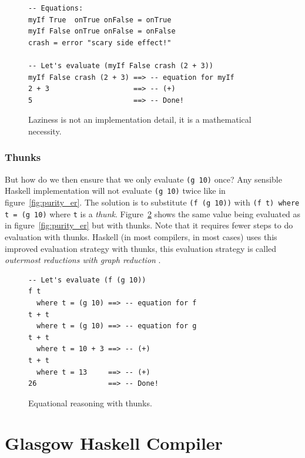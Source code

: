 \begin{figure}
\begin{mdframed}
  \begin{verbatim}
-- Equations:
myIf True  onTrue onFalse = onTrue
myIf False onTrue onFalse = onFalse
crash = error "scary side effect!"

-- Let's evaluate (myIf False crash (2 + 3))
myIf False crash (2 + 3) ==> -- equation for myIf
2 + 3                    ==> -- (+)
5                        ==> -- Done!
  \end{verbatim}
  \caption{Laziness is not an implementation detail, it is a mathematical necessity.}
  \label{fig:laziness}
\end{mdframed}
\end{figure}


\subsubsection{Thunks}

But how do we then ensure that we only evaluate \texttt{(g 10)} once?
Any sensible Haskell implementation will not evaluate \texttt{(g 10)} twice like in figure~\ref{fig:purity_er}.
The solution is to substitute \texttt{(f (g 10))} with \texttt{(f
t) where t = (g 10)} where \texttt{t} is a \emph{thunk}. Figure~\ref{fig:thunks_er} shows the same value being evaluated as in figure~\ref{fig:purity_er} but with thunks. Note that it requires fewer steps
to do evaluation with thunks. Haskell (in most compilers, in most cases)
uses this improved evaluation strategy with thunks, this evaluation
strategy is called \emph{outermost reductions with graph reduction}
\cite{wikibooks_graph_reduction}.

\begin{figure}
\begin{mdframed}
  \begin{verbatim}
-- Let's evaluate (f (g 10))
f t
  where t = (g 10) ==> -- equation for f
t + t
  where t = (g 10) ==> -- equation for g
t + t
  where t = 10 + 3 ==> -- (+)
t + t
  where t = 13     ==> -- (+)
26                 ==> -- Done!
  \end{verbatim}
  \caption{Equational reasoning with thunks.}
  \label{fig:thunks_er}
\end{mdframed}
\end{figure}

\section{Glasgow Haskell Compiler}

